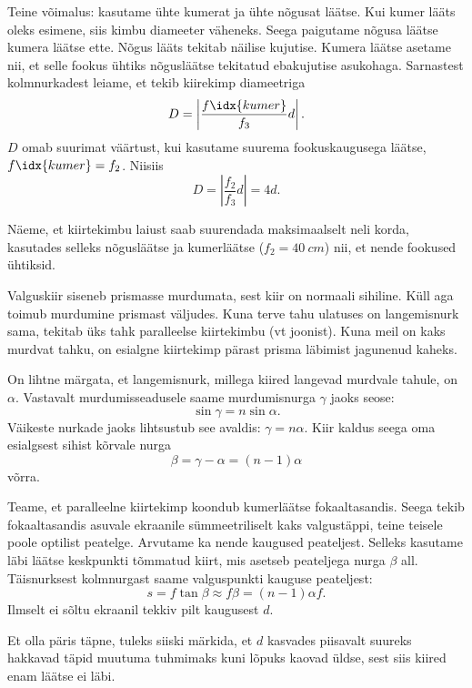 \documentclass[10pt, twoside]{article}
\begin{document}
{Teine võimalus: kasutame ühte kumerat ja ühte nõgusat läätse. Kui kumer lääts oleks esimene, siis kimbu diameeter väheneks. Seega paigutame nõgusa läätse kumera läätse ette. Nõgus lääts tekitab näilise kujutise. Kumera läätse asetame nii, et selle fookus ühtiks nõgusläätse tekitatud ebakujutise asukohaga. Sarnastest kolmnurkadest leiame, et tekib kiirekimp diameetriga
\[
D = \left|\frac{f\idx{kumer}}{f_3}d\right|.
\]
$D$ omab suurimat väärtust, kui kasutame suurema fookuskaugusega läätse, $f\idx{kumer} = f_2$. Niisiis
\[
D = \left|\frac{f_2}{f_3}d\right| = 4d.
\]


Näeme, et kiirtekimbu laiust saab suurendada maksimaalselt neli korda, kasutades selleks nõgusläätse ja kumerläätse ($f_2 = \SI{40}{cm}$) nii, et nende fookused ühtiksid.
\probend
\bigskip


\solu
Valguskiir siseneb prismasse murdumata, sest kiir on normaali sihiline. Küll aga toimub murdumine prismast väljudes. Kuna terve tahu ulatuses on langemisnurk sama, tekitab üks tahk paralleelse kiirtekimbu (vt joonist). Kuna meil on kaks murdvat tahku, on esialgne kiirtekimp pärast prisma läbimist jagunenud kaheks.

On lihtne märgata, et langemisnurk, millega kiired langevad murdvale tahule, on $\alpha$. 
Vastavalt murdumisseadusele saame murdumisnurga $\gamma$ jaoks seose:
\[
\sin \gamma = n \sin \alpha.
\]
Väikeste nurkade jaoks lihtsustub see avaldis: $\gamma = n\alpha$. Kiir kaldus seega oma esialgsest sihist kõrvale nurga
\[
\beta = \gamma - \alpha = (n - 1) \alpha
\]
võrra. 

Teame, et paralleelne kiirtekimp koondub kumerläätse fokaaltasandis. Seega tekib fokaaltasandis asuvale ekraanile sümmeetriliselt kaks valgustäppi, teine teisele poole optilist peatelge. Arvutame ka nende kaugused peateljest. Selleks kasutame läbi läätse keskpunkti tõmmatud kiirt, mis asetseb peateljega nurga $\beta$ all. Täisnurksest kolmnurgast saame valguspunkti kauguse peateljest:
\[
s = f \tan \beta \approx f \beta = (n - 1)\alpha f.
\]
Ilmselt ei sõltu ekraanil tekkiv pilt kaugusest $d$.

Et olla päris täpne, tuleks siiski märkida, et $d$ kasvades piisavalt suureks hakkavad täpid muutuma tuhmimaks kuni lõpuks kaovad üldse, sest siis kiired enam läätse ei läbi.

}
\end{document}
